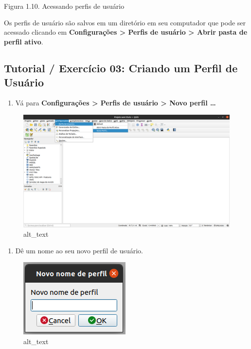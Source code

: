 \documentclass[
  portuguese,
]{krantz}
\providecommand{\tightlist}{%
  \setlength{\itemsep}{0pt}\setlength{\parskip}{0pt}}
\begin{document}
Figura 1.10. Acessando perfis de usuário

Os perfis de usuário são salvos em um diretório em seu computador que pode ser acessado clicando em \textbf{Configurações \textgreater{} Perfis de usuário \textgreater{} Abrir pasta de perfil ativo}.

\hypertarget{tutorial-exercuxedcio-03-criando-um-perfil-de-usuuxe1rio}{%
\subsection{\texorpdfstring{\textbf{Tutorial / Exercício 03: Criando um Perfil de Usuário}}{Tutorial / Exercício 03: Criando um Perfil de Usuário}}\label{tutorial-exercuxedcio-03-criando-um-perfil-de-usuuxe1rio}}

\begin{enumerate}
\def\labelenumi{\arabic{enumi}.}
\tightlist
\item
  Vá para \textbf{Configurações \textgreater{} Perfis de usuário \textgreater{} Novo perfil \ldots{}}
\end{enumerate}

\begin{figure}
\centering
\includegraphics{media/modulo1/user-profiles-2.png}
\caption{alt\_text}
\end{figure}

\begin{enumerate}
\def\labelenumi{\arabic{enumi}.}
\setcounter{enumi}{1}
\tightlist
\item
  Dê um nome ao seu novo perfil de usuário.
\end{enumerate}

\begin{figure}
\centering
\includegraphics{media/modulo1/user-profiles-3.png}
\caption{alt\_text}
\end{figure}
\end{document}
